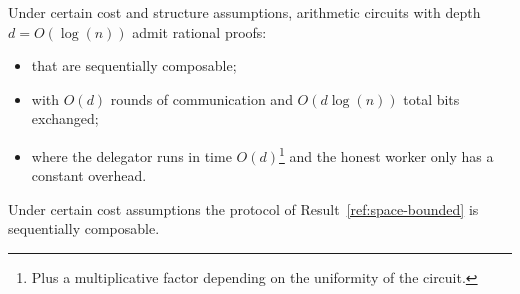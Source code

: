 \begin{result}\label{res:sq1}
	Under certain cost and structure assumptions, arithmetic circuits with depth $d = O(\log(n))$ admit rational proofs:
	\begin{itemize}
		\item that are sequentially composable;
		\item with $O(d)$ rounds of communication and $O(d \log(n))$ total bits exchanged;
		\item where the delegator runs in time $O(d)$\footnote{Plus a multiplicative factor depending on the uniformity of the circuit.} and the honest worker only has a constant overhead.
	\end{itemize}
\end{result}

\begin{result}\label{res:sq2}
	Under certain cost assumptions the protocol of Result~\ref{ref:space-bounded} is sequentially composable.
\end{result}


\begin{comment}
Our results above assume a "No Free Computation" assumption stating roughly: ``if a machine uses only a fraction $\gamma$ of the resources expected to compute $f(x)$ then it should expect an error probability of at least roughly $1-\gamma$''\footnote{As a rough analogy, one can think about it as if the function $f$ acted as a random oracle and thus can only be brute-forced.}.
Such an assumption is required for multiple delegations as we need some guarantee on the error probability of a ``lazy'' worker.
This assumption has a few limitations: it is specific to a distribution thus not necessarily supporting arbitrary inputs; it may be strongly tied to a specific model of computation (e.g. circuit vs Turing machines); it is an open problem whether it naturally holds for certain classes of problems.
\end{comment}

